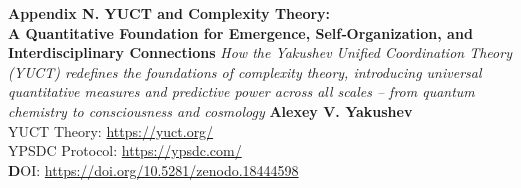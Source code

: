 \documentclass[11pt]{article}
\theoremstyle{remark}
\begin{document}
	
	\begin{titlepage} 
		\begin{center}
			\vspace*{0cm}
			\Huge\textbf{Appendix N. YUCT and Complexity Theory: \\ A Quantitative Foundation for Emergence, Self‑Organization, and Interdisciplinary Connections}
			\vspace{1.2cm}
			\small\textit{How the Yakushev Unified Coordination Theory (YUCT) redefines the foundations of complexity theory, introducing universal quantitative measures and predictive power across all scales – from quantum chemistry to consciousness and cosmology}
			\vspace{1.2cm}
			\small\textbf{Alexey V. Yakushev} \\
	YUCT Theory: \url{https://yuct.org/}\\
YPSDC Protocol: \url{https://ypsdc.com/}\\


\vspace{2cm}
\textbf DOI: \url{https://doi.org/10.5281/zenodo.18444598}\\

\vspace{1cm}


\end{center}
\end{titlepage}
\end{document}
